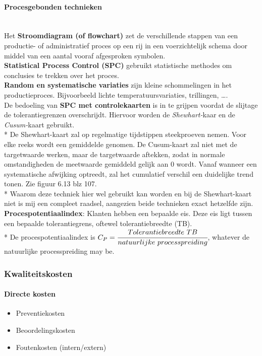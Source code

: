 \documentclass[12pt]{article}
\begin{document}
\paragraph{Procesgebonden technieken}\mbox{}\\
Het \textbf{Stroomdiagram (of flowchart)} zet de verschillende stappen van een productie- of administratief proces op een rij in een voerzichtelijk schema door middel van een aantal vooraf afgesproken symbolen.\\
\textbf{Statistical Process Control (SPC)} gebruikt statistische methodes om conclusies te trekken over het proces.\\
\textbf{Random en systematische variaties} zijn kleine schommelingen in het productieproces. Bijvoorbeeld lichte temperatuursvariaties, trillingen, \dots.\\
De bedoeling van \textbf{SPC met controlekaarten} is in te grijpen voordat de slijtage de tolerantiegrenzen overschrijdt. Hiervoor worden de \textit{Shewhart-}kaar en de \textit{Cusum-}kaart gebruikt.\\*
De Shewhart-kaart zal op regelmatige tijdstippen steekproeven nemen. Voor elke reeks wordt een gemiddelde genomen. De Cusum-kaart zal niet met de targetwaarde werken, maar de targetwaarde aftekken, zodat in normale omstandigheden de meetwaarde gemiddeld gelijk aan $0$ wordt. Vanaf wanneer een systematische afwijking optreedt, zal het cumulatief verschil een duidelijke trend tonen. Zie figuur 6.13 blz 107.\\*
Waarom deze techniek hier wel gebruikt kan worden en bij de Shewhart-kaart niet is mij een compleet raadsel, aangezien beide technieken exact hetzelfde zijn.\\
\textbf{Procespotentiaalindex}: Klanten hebben een bepaalde eis. Deze eis ligt tussen een bepaalde tolerantiegrens, oftewel tolerantiebreedte (TB).\\*
De procespotentiaalindex is $C_P = \cfrac{Tolerantiebreedte\ TB}{natuurlijke\ processpreiding}$, whatever de natuurlijke processpreiding may be.
\subsubsection{Kwaliteitskosten}
\paragraph{Directe kosten}
\begin{itemize}
\item Preventiekosten
\item Beoordelingskosten
\item Foutenkosten (intern/extern)
\end{itemize}
\end{document}
